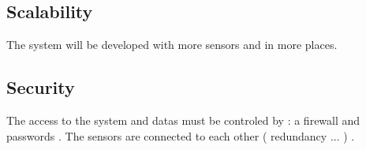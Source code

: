 \subsection{Scalability}
The system will be developed with more sensors and in more places.

\subsection{Security}
The access to the system and datas must be controled by : a firewall and passwords .
The sensors are connected to each other ( redundancy ... ) .


